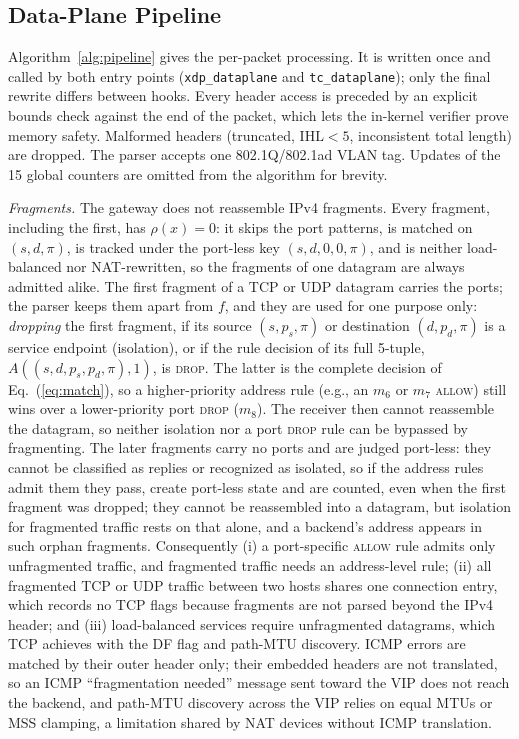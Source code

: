 \documentclass[conference]{IEEEtran}
\begin{document}
\subsection{Data-Plane Pipeline}
Algorithm~\ref{alg:pipeline} gives the per-packet processing. It is written
once and called by both entry points (\texttt{xdp\_dataplane} and
\texttt{tc\_dataplane}); only the final rewrite differs between hooks. Every
header access is preceded by an explicit bounds check against the end of the
packet, which lets the in-kernel verifier prove memory safety. Malformed
headers (truncated, $\mathrm{IHL}<5$, inconsistent total length) are dropped.
The parser accepts one 802.1Q/802.1ad VLAN tag. Updates of the 15 global
counters are omitted from the algorithm for brevity.

\textit{Fragments.} The gateway does not reassemble IPv4 fragments. Every
fragment, including the first, has $\rho(x)=0$: it skips the port patterns,
is matched on $(s,d,\pi)$, is tracked under the port-less key $(s,d,0,0,\pi)$,
and is neither load-balanced nor NAT-rewritten, so the fragments of one
datagram are always admitted alike. The first fragment of a TCP or UDP
datagram carries the ports; the parser keeps them apart from $f$, and they
are used for one purpose only: \emph{dropping} the first fragment, if its
source $(s,p_s,\pi)$ or destination $(d,p_d,\pi)$ is a service endpoint
(isolation), or if the rule decision of its full 5-tuple,
$A((s,d,p_s,p_d,\pi),1)$, is \textsc{drop}. The latter is the complete
decision of Eq.~(\ref{eq:match}), so a higher-priority address rule (e.g., an
$m_6$ or $m_7$ \textsc{allow}) still wins over a lower-priority port
\textsc{drop} ($m_8$). The receiver then cannot reassemble the datagram, so
neither isolation nor a port \textsc{drop} rule can be bypassed by
fragmenting. The later fragments carry no ports and are judged port-less:
they cannot be classified as replies or recognized as isolated, so if the
address rules admit them they pass, create port-less state and are counted,
even when the first fragment was dropped; they cannot be reassembled into a
datagram, but isolation for fragmented traffic rests on that alone, and
a backend's address appears in such orphan fragments. Consequently (i) a port-specific \textsc{allow} rule
admits only unfragmented traffic, and fragmented traffic needs an
address-level rule; (ii) all fragmented TCP or UDP traffic between two hosts
shares one connection entry, which records no TCP flags because fragments are
not parsed beyond the IPv4 header; and (iii) load-balanced services require
unfragmented datagrams, which TCP achieves with the DF flag and path-MTU
discovery. ICMP errors are matched by their outer header only; their embedded
headers are not translated, so an ICMP ``fragmentation needed'' message sent
toward the VIP does not reach the backend, and path-MTU discovery across the
VIP relies on equal MTUs or MSS clamping, a limitation shared by NAT devices
without ICMP translation.
\end{document}

